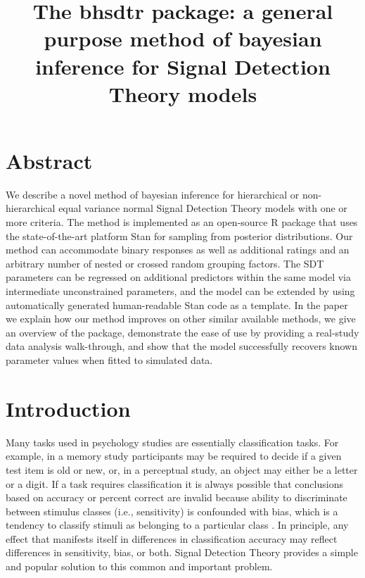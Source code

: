 \documentclass[oneside,a4paper]{article}
\title{The bhsdtr package: a general purpose method of bayesian
  inference for Signal Detection Theory models}
\begin{document}
\maketitle
\tableofcontents{}

\section{Abstract}

We describe a novel method of bayesian inference for hierarchical or
non-hierarchical equal variance normal Signal Detection Theory models
with one or more criteria. The method is implemented as an open-source
R package that uses the state-of-the-art platform Stan for sampling
from posterior distributions. Our method can accommodate binary
responses as well as additional ratings and an arbitrary number of
nested
or crossed random grouping factors. The SDT parameters can be
regressed on additional predictors within the same model via
intermediate unconstrained parameters, and the model can be extended
by using automatically generated human-readable Stan code as a
template. In the paper we explain how our method improves on other
similar available methods, we give an overview of the package,
demonstrate the ease of use by providing a real-study data analysis
walk-through, and show that the model successfully recovers known
parameter values when fitted to simulated data.

\section{Introduction}

Many tasks used in psychology studies are essentially classification
tasks. For example, in a memory study participants may be required to
decide if a given test item is old or new, or, in a perceptual study,
an object may either be a letter or a digit. If a task requires
classification it is always possible that conclusions based on
accuracy or percent correct are invalid because ability to
discriminate between stimulus classes (i.e., sensitivity) is
confounded with bias, which is a tendency to classify stimuli as
belonging to a particular class \cite{GreenSwets66}. In principle, any
effect that manifests itself in differences in classification accuracy
may reflect differences in sensitivity, bias, or both. Signal
Detection Theory provides a simple and popular solution to this common
and important problem.
\end{document}
